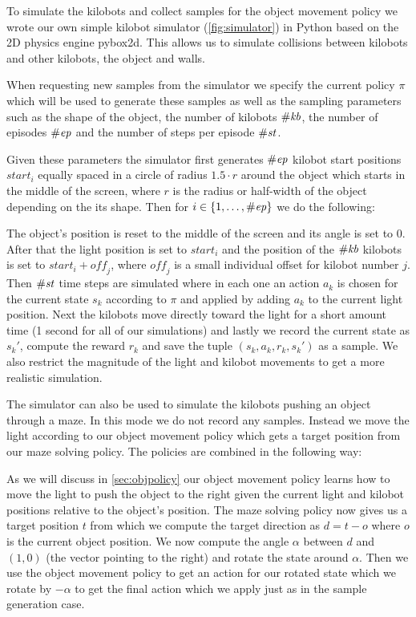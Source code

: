 \documentclass[twoside]{article}
\begin{document}
To simulate the kilobots and collect samples for the object movement policy we
wrote our own simple kilobot simulator (\autoref{fig:simulator}) in Python based
on the 2D physics engine pybox2d\cite{pybox2d}. This allows us to simulate
collisions between kilobots and other kilobots, the object and walls.

When requesting new samples from the simulator we specify the current policy
$\pi$ which will be used to generate these samples as well as the sampling
parameters such as the shape of the object, the number of kilobots $\#\mathit{kb}$, the
number of episodes $\#\mathit{ep}$ and the number of steps per episode $\#\mathit{st}$.

Given these parameters the simulator first generates $\#\mathit{ep}$ kilobot start
positions $\mathit{start}_i$ equally spaced in a circle of radius $1.5 \cdot r$
around the object which starts in the middle of the screen, where $r$ is the
radius or half-width of the object depending on the its shape. Then for
$i \in \{1, \dots, \#\mathit{ep}\}$ we do the following:

The object's position is reset to the middle of the screen and its angle is set
to 0. After that the light position is set to $\mathit{start}_i$ and the
position of the $\#\mathit{kb}$ kilobots is set to $\mathit{start}_i + \mathit{off}_j$,
where $\mathit{off}_j$ is a small individual offset for kilobot number $j$.
Then $\#\mathit{st}$ time steps are simulated where in each one an action $a_k$ is chosen
for the current state $s_k$ according to $\pi$ and applied by adding $a_k$ to
the current light position. Next the kilobots move directly toward the light for
a short amount time (1 second for all of our simulations) and lastly we record
the current state as $s_k'$, compute the reward $r_k$ and save the tuple $(s_k,
a_k, r_k, s_k')$ as a sample. We also restrict the magnitude of the light and
kilobot movements to get a more realistic simulation.

The simulator can also be used to simulate the kilobots pushing an object
through a maze. In this mode we do not record any samples. Instead we move the
light according to our object movement policy which gets a target position from
our maze solving policy. The policies are combined in the following way:

As we will discuss in \ref{sec:objpolicy} our object movement policy learns
how to move the light to push the object to the right given the current light
and kilobot positions relative to the object's position. The maze solving policy
now gives us a target position $t$ from which we compute the target direction as
$d = t - o$ where $o$ is the current object position. We now compute the angle
$\alpha$ between $d$ and $(1, 0)$ (the vector pointing to the right) and rotate
the state around $\alpha$. Then we use the object movement policy to get an
action for our rotated state which we rotate by $-\alpha$ to get the final
action which we apply just as in the sample generation case.
\end{document}

